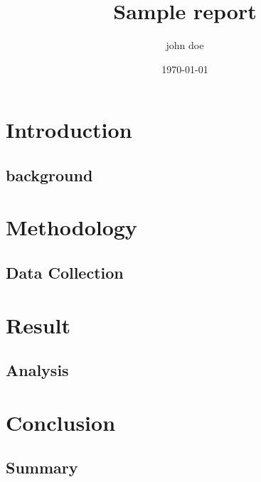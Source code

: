 \documentclass[a4paper,12pt]{report}
\title{Sample report}
\author{john doe}
\date{\today}
\begin{document}
\maketitle
\tableofcontents
\chapter{Introduction}
\section{background}
\lipsum[1-2]
\chapter{Methodology}
\section{Data Collection}
\lipsum[3-4]
\chapter{Result}
\section{Analysis}
\lipsum[5-6]
\chapter{Conclusion}
\section{Summary}
\lipsum[7-8]
\end{document}
